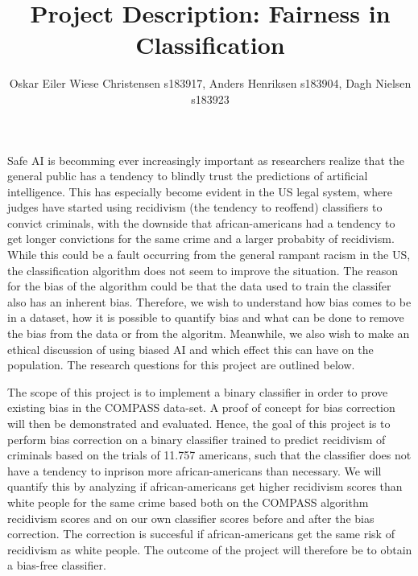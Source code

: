 \documentclass[11pt, fleqn]{article}
\title{Project Description: Fairness in Classification}
\author{\small Oskar Eiler Wiese Christensen s183917, Anders Henriksen s183904, Dagh Nielsen s183923}
\date{}
\begin{document}
	\maketitle
	\vspace*{-0.4cm}
	
	\noindent
	Safe AI is becomming ever increasingly important as researchers realize that the general public has a tendency to blindly trust the predictions of artificial intelligence. This has especially become evident in the US legal system, where judges have started using recidivism (the tendency to reoffend) classifiers to convict criminals, with the downside that african-americans had a tendency to get longer convictions for the same crime and a larger probabity of recidivism. While this could be a fault occurring from the general rampant racism in the US, the classification algorithm does not seem to improve the situation. The reason for the bias of the algorithm could be that the data used to train the classifer also has an inherent bias. Therefore, we wish to understand how bias comes to be in a dataset, how it is possible to quantify bias and what can be done to remove the bias from the data or from the algoritm. Meanwhile, we also wish to make an ethical discussion of using biased AI and which effect this can have on the population. The research questions for this project are outlined below. 
	
	The scope of this project is to implement a binary classifier in order to prove existing bias in the COMPASS data-set. A proof of concept for bias correction will then be demonstrated and evaluated. Hence, the goal of this project is to perform bias correction on a binary classifier trained to predict recidivism of criminals based on the trials of 11.757 americans, such that the classifier does not have a tendency to inprison more african-americans than necessary. We will quantify this by analyzing if african-americans get higher recidivism scores than white people for the same crime based both on the COMPASS algorithm recidivism scores and on our own classifier scores before and after the bias correction. The correction is succesful if african-americans get the same risk of recidivism as white people. The outcome of the project will therefore be to obtain a bias-free classifier.
	
	
\end{document}
